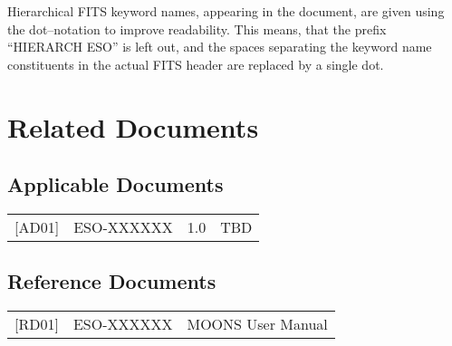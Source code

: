 Hierarchical FITS keyword names, appearing in the document, are given using the
dot--notation to improve readability. This means, that the prefix ``HIERARCH
ESO'' is left out, and the spaces separating the keyword name constituents in
the actual FITS header are replaced by a single dot.

\section{Related Documents}
\label{sec:doc-related}

\subsection{Applicable Documents}
\label{sec:doc-applicable}

\begin{tabularx}{\linewidth}{lllX}
  {[}AD01{]} & ESO-XXXXXX & 1.0
             & TBD \\
\end{tabularx}

\subsection{Reference Documents}
\label{sec:doc-reference}

\begin{tabularx}{\linewidth}{llX}
  {[}RD01{]} & ESO-XXXXXX
             & MOONS User Manual \\
\end{tabularx}


